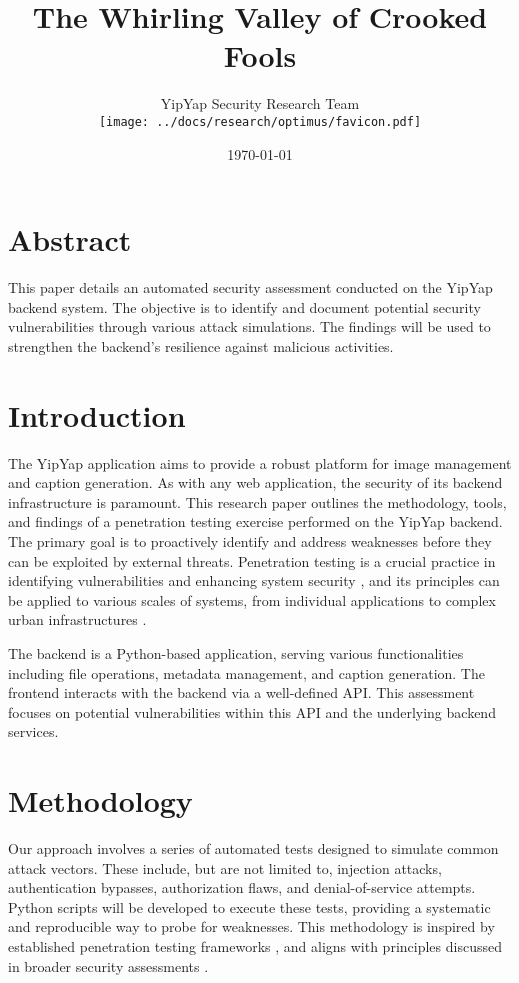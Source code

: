 \documentclass{article}
\title{The Whirling Valley of Crooked Fools}
\author{YipYap Security Research Team \\ \texttt{[image: ../docs/research/optimus/favicon.pdf]}}
\date{\today}
\begin{document}
\maketitle

\section*{Abstract}
This paper details an automated security assessment conducted on the YipYap backend system. The objective is to identify and document potential security vulnerabilities through various attack simulations. The findings will be used to strengthen the backend's resilience against malicious activities.

\section{Introduction}
The YipYap application aims to provide a robust platform for image management and caption generation. As with any web application, the security of its backend infrastructure is paramount. This research paper outlines the methodology, tools, and findings of a penetration testing exercise performed on the YipYap backend. The primary goal is to proactively identify and address weaknesses before they can be exploited by external threats. Penetration testing is a crucial practice in identifying vulnerabilities and enhancing system security \cite{Phong2014, Altulaihan2023}, and its principles can be applied to various scales of systems, from individual applications to complex urban infrastructures \cite{Conti2015}.

The backend is a Python-based application, serving various functionalities including file operations, metadata management, and caption generation. The frontend interacts with the backend via a well-defined API. This assessment focuses on potential vulnerabilities within this API and the underlying backend services.

\section{Methodology}
Our approach involves a series of automated tests designed to simulate common attack vectors. These include, but are not limited to, injection attacks, authentication bypasses, authorization flaws, and denial-of-service attempts. Python scripts will be developed to execute these tests, providing a systematic and reproducible way to probe for weaknesses. This methodology is inspired by established penetration testing frameworks \cite{Wai2001}, and aligns with principles discussed in broader security assessments \cite{Phong2014}.
\end{document}
